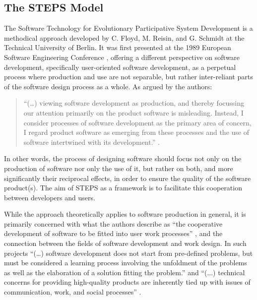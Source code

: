\subsection{The STEPS Model}

The Software Technology for Evolutionary Participative System Development is a methodical approach developed by C. Floyd, M. Reisin, and G. Schmidt at the Technical University of Berlin. It was first presented at the 1989 European Software Engineering Conference \cite{Floyd}, offering a different perspective on software development, specifically user-oriented software development, as a perpetual process where production and use are not separable, but rather inter-reliant parts of the software design process as a whole. As argued by the authors:

\begin{quotation}
	“(…) viewing software development as production, and thereby focussing our attention primarily on the product software is misleading. Instead, I consider processes of software development as the primary area of concern, I regard product software as emerging from these processes and the use of software intertwined with its development.” \cite[pp. 49]{Floyd}.
\end{quotation}



In other words, the process of designing software should focus not only on the production of software nor only the use of it, but rather on both, and more significantly their reciprocal effects, in order to ensure the quality of the software product(s). The aim of STEPS as a framework is to facilitate this cooperation between developers and users.

While the approach theoretically applies to software production in general, it is primarily concerned with what the authors describe as “the cooperative development of software to be fitted into user work processes” \cite[pp. 51]{Floyd}, and the connection between the fields of software development and work design. In such projects “(…) software development does not start from pre-defined problems, but must be considered a learning process involving the unfoldment of the problems as well as the elaboration of a solution fitting the problem.” \cite[pp. 50]{Floyd} and “(...) technical concerns for providing high-quality products are inherently tied up with issues of communication, work, and social processes” \cite[pp. 51]{Floyd}.

